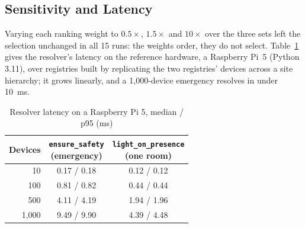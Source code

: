 \documentclass[conference]{IEEEtran}
\newcommand{\code}[1]{\texttt{#1}}
\begin{document}
\subsection{Sensitivity and Latency}
Varying each ranking weight to $0.5\times$, $1.5\times$ and $10\times$ over the three sets left the selection unchanged in all 15 runs: the weights order, they do not select. Table~\ref{tab:latency} gives the resolver's latency on the reference hardware, a Raspberry Pi~5 (Python 3.11), over registries built by replicating the two registries' devices across a site hierarchy; it grows linearly, and a 1{,}000-device emergency resolves in under 10~ms.

\begin{table}[t]
\caption{Resolver latency on a Raspberry Pi 5, median / p95 (ms)}
\label{tab:latency}
\centering
\footnotesize
\begin{tabular}{@{}rcc@{}}
\toprule
\textbf{Devices} & \shortstack{\code{ensure\_safety}\\(emergency)} & \shortstack{\code{light\_on\_presence}\\(one room)} \\
\midrule
10 & 0.17 / 0.18 & 0.12 / 0.12 \\
100 & 0.81 / 0.82 & 0.44 / 0.44 \\
500 & 4.11 / 4.19 & 1.94 / 1.96 \\
1{,}000 & 9.49 / 9.90 & 4.39 / 4.48 \\
\bottomrule
\end{tabular}
\end{table}
\end{document}
